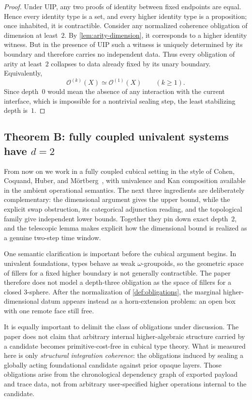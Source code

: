 \documentclass{lmcs}
\newcommand{\Ocal}{\mathcal{O}}
\begin{document}
\begin{proof}
Under UIP, any two proofs of identity between fixed endpoints are equal. Hence every identity type is a set, and every higher identity type is a proposition; once inhabited, it is contractible. Consider any normalized coherence obligation of dimension at least~$2$. By \autoref{lem:arity-dimension}, it corresponds to a higher identity witness. But in the presence of UIP such a witness is uniquely determined by its boundary and therefore carries no independent data. Thus every obligation of arity at least~$2$ collapses to data already fixed by its unary boundary. Equivalently,
\[
  \Ocal^{(k)}(X) \simeq \Ocal^{(1)}(X)
  \qquad
  (k \geq 1).
\]
Since depth~$0$ would mean the absence of any interaction with the current interface, which is impossible for a nontrivial sealing step, the least stabilizing depth is~$1$.
\end{proof}

\subsection{\texorpdfstring{Theorem B: fully coupled univalent systems have $d=2$}{Theorem B: fully coupled univalent systems have d=2}}

From now on we work in a fully coupled cubical setting in the style of Cohen, Coquand, Huber, and M\"ortberg~\cite{cubical,cchm-hits}, with univalence and Kan composition available in the ambient operational semantics. The next three ingredients are deliberately complementary: the dimensional argument gives the upper bound, while the explicit swap obstruction, its categorical adjunction reading, and the topological family give independent lower bounds. Together they pin down exact depth~$2$, and the telescopic lemma makes explicit how the dimensional bound is realized as a genuine two-step time window.

One semantic clarification is important before the cubical argument begins. In univalent foundations, types behave as weak $\omega$-groupoids, so the geometric space of fillers for a fixed higher boundary is not generally contractible. The paper therefore does not model a depth-three obligation as the space of fillers for a closed $3$-sphere. After the normalization of \autoref{def:obligations}, the marginal higher-dimensional datum appears instead as a horn-extension problem: an open box with one remote face still free.

It is equally important to delimit the class of obligations under discussion. The paper does not claim that arbitrary internal higher-algebraic structure carried by a candidate becomes primitive-cost-free in cubical type theory. What is measured here is only \emph{structural integration coherence}: the obligations induced by sealing a globally acting foundational candidate against prior opaque layers. Those obligations arise from the chronological dependency graph of exported payload and trace data, not from arbitrary user-specified higher operations internal to the candidate.
\end{document}
